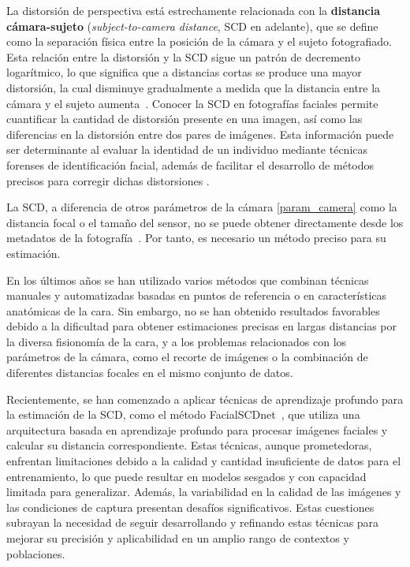 La distorsión de perspectiva está estrechamente relacionada con la \textbf{distancia cámara-sujeto} (\textit{subject-to-camera distance}, SCD en adelante), que se define como la separación física entre la posición de la cámara y el sujeto fotografiado. Esta relación entre la distorsión y la SCD sigue un patrón de decremento logarítmico, lo que significa que a distancias cortas se produce una mayor distorsión, la cual disminuye gradualmente a medida que la distancia entre la cámara y el sujeto aumenta~\cite{55}. Conocer la SCD en fotografías faciales permite cuantificar la cantidad de distorsión presente en una imagen, así como las diferencias en la distorsión entre dos pares de imágenes. Esta información puede ser determinante al evaluar la identidad de un individuo mediante técnicas forenses de identificación facial, además de facilitar el desarrollo de métodos precisos para corregir dichas distorsiones \cite{16}.

La SCD, a diferencia de otros parámetros de la cámara \ref{param_camera} como la distancia focal o el tamaño del sensor, no se puede obtener directamente desde los metadatos de la fotografía~\cite{8}. Por tanto, es necesario un método preciso para su estimación.

En los últimos años se han utilizado varios métodos que combinan técnicas manuales y automatizadas basadas en puntos de referencia o en características anatómicas de la cara\cite{28,30,20}. Sin embargo, no se han obtenido resultados favorables debido a la dificultad para obtener estimaciones precisas en largas distancias por la diversa fisionomía de la cara, y a los problemas relacionados con los parámetros de la cámara, como el recorte de imágenes o la combinación de diferentes distancias focales en el mismo conjunto de datos.

Recientemente, se han comenzado a aplicar técnicas de aprendizaje profundo para la estimación de la SCD, como el método FacialSCDnet~\cite{14}, que utiliza una arquitectura basada en aprendizaje profundo para procesar imágenes faciales y calcular su distancia correspondiente. Estas técnicas, aunque prometedoras, enfrentan limitaciones debido a la calidad y cantidad insuficiente de datos para el entrenamiento, lo que puede resultar en modelos sesgados y con capacidad limitada para generalizar. Además, la variabilidad en la calidad de las imágenes y las condiciones de captura presentan desafíos significativos. Estas cuestiones subrayan la necesidad de seguir desarrollando y refinando estas técnicas para mejorar su precisión y aplicabilidad en un amplio rango de contextos y poblaciones.

